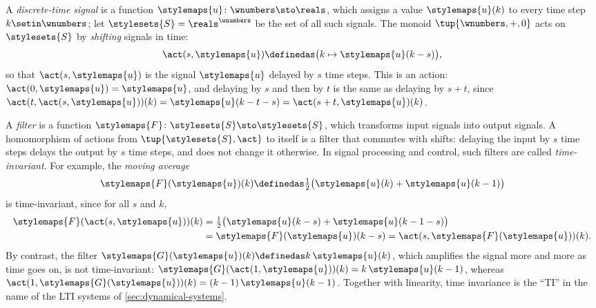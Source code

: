 \begin{example}
    \label{exa:time-invariant-filter}
    A \emph{discrete-time signal} is a function $\stylemaps{u} \colon \wnumbers \sto \reals$, which assigns a value $\stylemaps{u}(k)$ to every time step $k \setin \wnumbers$; let $\stylesets{S} = \reals^{\wnumbers}$ be the set of all such signals.
    The monoid $\tup{\wnumbers, +, 0}$ acts on $\stylesets{S}$ by \emph{shifting} signals in time:
    \begin{equation}
        \act(s, \stylemaps{u}) \definedas \bigl(k \mapsto \stylemaps{u}(k - s)\bigr),
    \end{equation}
    so that $\act(s, \stylemaps{u})$ is the signal $\stylemaps{u}$ delayed by $s$ time steps.
    This is an action: $\act(0, \stylemaps{u}) = \stylemaps{u}$, and delaying by $s$ and then by $t$ is the same as delaying by $s + t$, since $\act(t, \act(s, \stylemaps{u}))(k) = \stylemaps{u}(k - t - s) = \act(s + t, \stylemaps{u})(k)$.

    A \emph{filter} is a function $\stylemaps{F} \colon \stylesets{S} \sto \stylesets{S}$, which transforms input signals into output signals.
    A homomorphism of actions from $\tup{\stylesets{S}, \act}$ to itself is a filter that commutes with shifts: delaying the input by $s$ time steps delays the output by $s$ time steps, and does not change it otherwise.
    In signal processing and control, such filters are called \emph{time-invariant}.
    For example, the \emph{moving average}
    \begin{equation}
        \stylemaps{F}(\stylemaps{u})(k) \definedas \tfrac{1}{2}\bigl(\stylemaps{u}(k) + \stylemaps{u}(k - 1)\bigr)
    \end{equation}
    is time-invariant, since for all $s$ and $k$,
    \begin{equation}
        \begin{aligned}
            \stylemaps{F}(\act(s, \stylemaps{u}))(k)
            & = \tfrac{1}{2}\bigl(\stylemaps{u}(k - s) + \stylemaps{u}(k - 1 - s)\bigr) \\
            & = \stylemaps{F}(\stylemaps{u})(k - s)
            = \act(s, \stylemaps{F}(\stylemaps{u}))(k).
        \end{aligned}
    \end{equation}
    By contrast, the filter $\stylemaps{G}(\stylemaps{u})(k) \definedas k \, \stylemaps{u}(k)$, which amplifies the signal more and more as time goes on, is not time-invariant: $\stylemaps{G}(\act(1, \stylemaps{u}))(k) = k \, \stylemaps{u}(k - 1)$, whereas $\act(1, \stylemaps{G}(\stylemaps{u}))(k) = (k - 1) \, \stylemaps{u}(k - 1)$.
    Together with linearity, time invariance is the ``TI'' in the name of the LTI systems of \cref{sec:dynamical-systems}.
\end{example}

